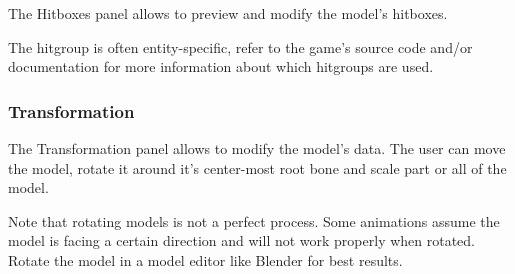 \documentclass[10pt, a4paper, titlepage, oneside]{article}
\begin{document}
The Hitboxes panel allows to preview and modify the model's hitboxes.

\vspace{\baselineskip}
The hitgroup is often entity-specific, refer to the game's source code and/or documentation for more information about which hitgroups are used.

\subsubsection{Transformation}

The Transformation panel allows to modify the model's data. The user can move the model, rotate it around it's center-most root bone and scale part or all of the model.

\vspace{\baselineskip}
Note that rotating models is not a perfect process. Some animations assume the model is facing a certain direction and will not work properly when rotated. Rotate the model in a model editor like Blender for best results.

\setlength{\parindent}{15pt}
\end{document}
